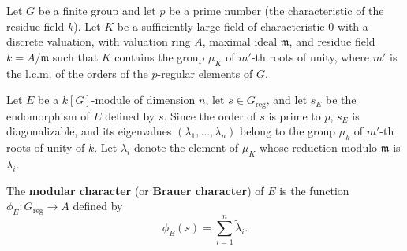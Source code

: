 Let $G$ be a finite group and let $p$ be a prime number (the characteristic of the residue field $k$). Let $K$ be a sufficiently large field of characteristic $0$ with a discrete valuation, with valuation ring $A$, maximal ideal $\mathfrak{m}$, and residue field $k = A/\mathfrak{m}$ such that $K$ contains the group $\mu_K$ of $m'$-th roots of unity, where $m'$ is the l.c.m. of the orders of the $p$-regular elements of $G$.

Let $E$ be a $k[G]$-module of dimension $n$, let $s \in G_{\text{reg}}$, and let $s_E$ be the endomorphism of $E$ defined by $s$. Since the order of $s$ is prime to $p$, $s_E$ is diagonalizable, and its eigenvalues $(\lambda_1, \ldots, \lambda_n)$ belong to the group $\mu_k$ of $m'$-th roots of unity of $k$. Let $\tilde{\lambda}_i$ denote the element of $\mu_K$ whose reduction modulo $\mathfrak{m}$ is $\lambda_i$.

The \textbf{modular character} (or \textbf{Brauer character}) of $E$ is the function $\phi_E: G_{\text{reg}} \to A$ defined by
$$\phi_E(s) = \sum_{i=1}^{n} \tilde{\lambda}_i.$$

